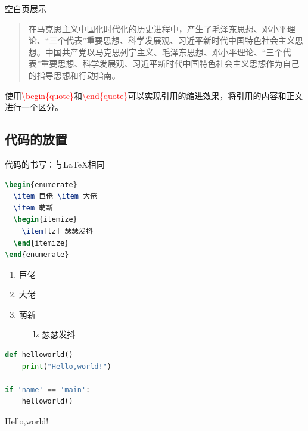 \documentclass{beamer}
\begin{document}
\begin{frame}{空白页展示}
\begin{quote}
    在马克思主义中国化时代化的历史进程中，产生了毛泽东思想、邓小平理论、“三个代表”重要思想、科学发展观、习近平新时代中国特色社会主义思想。中国共产党以马克思列宁主义、毛泽东思想、邓小平理论、“三个代表”重要思想、科学发展观、习近平新时代中国特色社会主义思想作为自己的指导思想和行动指南。
\end{quote}
使用\textcolor{red}{\textbackslash begin\{quote\}}和\textcolor{red}{\textbackslash end\{quote\}}可以实现引用的缩进效果，将引用的内容和正文进行一个区分。
\end{frame}

\subsection{代码的放置}
\begin{frame}[fragile]{代码的书写：与\LaTeX{}相同}
    \begin{minipage}{0.5\linewidth}
        \begin{lstlisting}[language=TeX]
\begin{enumerate}
  \item 巨佬 \item 大佬
  \item 萌新
  \begin{itemize}
    \item[lz] 瑟瑟发抖
  \end{itemize}
\end{enumerate}
        \end{lstlisting}
    \end{minipage}\hspace{1cm}
    \begin{minipage}{0.3\linewidth}
        \begin{enumerate}
            \item 巨佬
            \item 大佬
            \item 萌新
            \begin{itemize}
                \item[lz] 瑟瑟发抖
            \end{itemize}
        \end{enumerate}
    \end{minipage}\hspace{1cm}

    \begin{minipage}{0.5\linewidth}
        \begin{lstlisting}[language=python]
def helloworld()
    print("Hello,world!")

if 'name' == 'main':
    helloworld()
        \end{lstlisting}
    \end{minipage}\hspace{1cm}
    \begin{minipage}{0.3\linewidth}
          Hello,world!
    \end{minipage}\hspace{1cm}
\end{frame}
\end{document}
